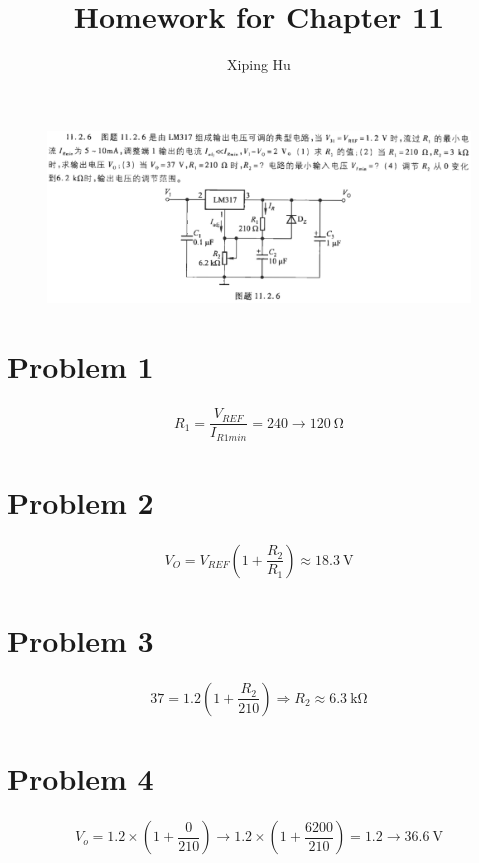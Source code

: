 \documentclass{article}
\author{Xiping Hu}
\affil{https://hxp.plus/}
\title{Homework for Chapter 11}
\newcommand{\si}[1]{\  \mathrm{#1}}
\begin{document}
\maketitle

\begin{figure}[H]
  \centering
  \includegraphics[width=\linewidth]{figures/Problem1126}
\end{figure}

\section{Problem 1}

\begin{equation*}
  \begin{aligned}
    R_1 = \dfrac{V_{REF}}{I_{R1min}} = 240 \rightarrow 120 \si{\Omega} 
  \end{aligned}
\end{equation*}

\section{Problem 2}

\begin{equation*}
  \begin{aligned}
    V_O = V_{REF} \left( 1 + \dfrac{R_2}{R_1}  \right) \approx 18.3 \si{V}
  \end{aligned}
\end{equation*}

\section{Problem 3}

\begin{equation*}
  \begin{aligned}
    37 = 1.2 \left( 1 + \dfrac{R_2}{210} \right) \Rightarrow R_2 \approx 6.3 \si{k\Omega}
  \end{aligned}
\end{equation*}

\section{Problem 4}

\begin{equation*}
  \begin{aligned}
    V_o = 1.2 \times \left( 1 + \dfrac{0}{210}  \right) \rightarrow 1.2 \times \left( 1 + \dfrac{6200}{210}  \right) = 1.2 \rightarrow 36.6 \si{V}
  \end{aligned}
\end{equation*}
\end{document}
